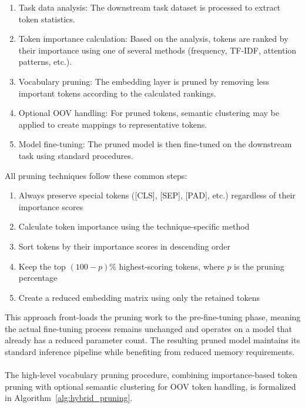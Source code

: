 \documentclass[twocolumn]{article}
\begin{document}
\begin{enumerate}
    \item Task data analysis: The downstream task dataset is processed to extract token statistics.
    \item Token importance calculation: Based on the analysis, tokens are ranked by their importance using one of several methods (frequency, TF-IDF, attention patterns, etc.).
    \item Vocabulary pruning: The embedding layer is pruned by removing less important tokens according to the calculated rankings.
    \item Optional OOV handling: For pruned tokens, semantic clustering may be applied to create mappings to representative tokens.
    \item Model fine-tuning: The pruned model is then fine-tuned on the downstream task using standard procedures.
\end{enumerate}
All pruning techniques follow these common steps:
\begin{enumerate}
    \item Always preserve special tokens ([CLS], [SEP], [PAD], etc.) regardless of their importance scores
    \item Calculate token importance using the technique-specific method
    \item Sort tokens by their importance scores in descending order
    \item Keep the top $(100-p)\%$ highest-scoring tokens, where $p$ is the pruning percentage
    \item Create a reduced embedding matrix using only the retained tokens
\end{enumerate}
This approach front-loads the pruning work to the pre-fine-tuning phase, meaning the actual fine-tuning process remains unchanged and operates on a model that already has a reduced parameter count. The resulting pruned model maintains its standard inference pipeline while benefiting from reduced memory requirements.
\\ \\
The high-level vocabulary pruning procedure, combining importance-based token pruning with optional semantic clustering for OOV token handling, is formalized in Algorithm~\ref{alg:hybrid_pruning}.
\end{document}
